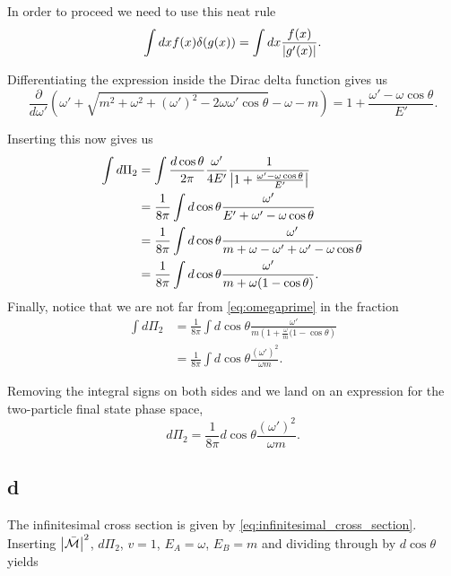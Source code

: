 \documentclass[11pt, a4paper]{amsart}
\begin{document}
In order to proceed we need to use this neat rule
\begin{equation}
\int dx f(x) \delta(g(x)) = \int dx \frac{f(x)}{\abs{g'(x)}}.
\end{equation}

Differentiating the expression inside the Dirac delta function gives us
\begin{equation}
\frac{\partial}{d\omega'} \left(\omega' + \sqrt{m^2 + \omega^2 + (\omega')^2 - 2\omega\omega'\cos\theta} - \omega -m \right)
= 1 + \frac{\omega' - \omega\cos\theta}{E'}.
\end{equation}

Inserting this now gives us
\begin{align}
\int d\Pi_2 &= \int \frac{d\cos\theta}{2\pi} \frac{\omega'}{4E'} \frac{1}{\abs{1 + \frac{\omega' - \omega\cos\theta}{E'}}} \\
			&= \frac{1}{8\pi} \int d\cos \theta \frac{\omega'}{E' + \omega' - \omega\cos\theta} \\
			&= \frac{1}{8\pi} \int d\cos \theta \frac{\omega'}{m + \omega - \omega' + \omega' - \omega\cos\theta} \\
			&= \frac{1}{8\pi} \int d\cos \theta \frac{\omega'}{m + \omega(1 - \cos\theta)}.
\end{align}
Finally, notice that we are not far from \autoref{eq:omegaprime} in the fraction
\begin{align}
\int d\Pi_2 &= \frac{1}{8\pi} \int d\cos \theta \frac{\omega'}{m\left(1 + \frac{\omega}{m}(1 - \cos\theta\right)} \\
 			&= \frac{1}{8\pi} \int d\cos \theta \frac{(\omega')^2}{\omega m}.
\end{align}

Removing the integral signs on both sides and we land on an expression for the two-particle final state phase space,
\begin{equation}
d\Pi_2 = \frac{1}{8\pi} d\cos \theta \frac{(\omega')^2}{\omega m}.
\end{equation}

\subsection*{d}
The infinitesimal cross section is given by \autoref{eq:infinitesimal_cross_section}. Inserting $\abs{\bar{\mathcal{M}}}^2$, $d\Pi_2$, $v= 1$, $E_A = \omega$, $E_B = m$ and dividing through by $d\cos\theta$ yields
\end{document}
